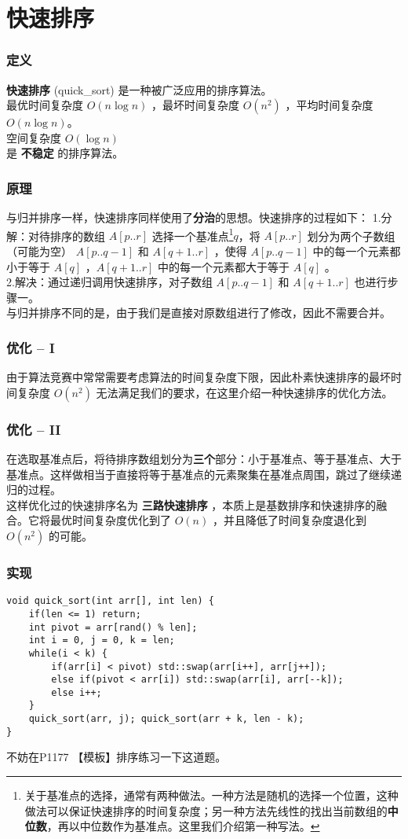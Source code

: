 \documentclass{beamer}
\newcommand{\fdf}[1]{\alert{\textbf{#1}}}
\begin{document}
\section{快速排序}
\begin{frame}
\frametitle{定义}
\fdf{快速排序} (quick\_sort) 是一种被广泛应用的排序算法。\\ 
最优时间复杂度 $O(n\log n)$ ，最坏时间复杂度 $O(n^2)$ ，平均时间复杂度 $O(n\log n)$。\\ 
空间复杂度 $O(\log n)$\\ 
是 \fdf{不稳定} 的排序算法。
\end{frame}
\begin{frame}
\frametitle{原理}
与归并排序一样，快速排序同样使用了\fdf{分治}的思想。快速排序的过程如下：
1.分解：对待排序的数组 $A[p..r]$ 选择一个基准点\footnote{关于基准点的选择，通常有两种做法。一种方法是随机的选择一个位置，这种做法可以保证快速排序的时间复杂度；另一种方法先线性的找出当前数组的\fdf{中位数}，再以中位数作为基准点。这里我们介绍第一种写法。}$q$，将 $A[p..r]$ 划分为两个子数组（可能为空） $A[p..q-1]$ 和 $A[q+1..r]$ ，使得 $A[p..q-1]$ 中的每一个元素都小于等于 $A[q]$ ，$A[q+1..r]$ 中的每一个元素都大于等于 $A[q]$ 。	\\
2.解决：通过递归调用快速排序，对子数组 $A[p..q-1]$ 和 $A[q+1..r]$ 也进行步骤一。\\ 
与归并排序不同的是，由于我们是直接对原数组进行了修改，因此不需要合并。
\end{frame}
\begin{frame}
\frametitle{优化 -- I}
由于算法竞赛中常常需要考虑算法的时间复杂度下限，因此朴素快速排序的最坏时间复杂度 $O(n^2)$ 无法满足我们的要求，在这里介绍一种快速排序的优化方法。
\end{frame}
\begin{frame}
\frametitle{优化 -- II}
在选取基准点后，将待排序数组划分为\fdf{三个}部分：小于基准点、等于基准点、大于基准点。这样做相当于直接将等于基准点的元素聚集在基准点周围，跳过了继续递归的过程。\\
这样优化过的快速排序名为	 \fdf{三路快速排序} ，本质上是基数排序和快速排序的融合。它将最优时间复杂度优化到了 $O(n)$ ，并且降低了时间复杂度退化到 $O(n^2)$ 的可能。
\end{frame}
\begin{frame}[fragile]
\frametitle{实现}
\begin{onlyenv}
\begin{verbatim}
void quick_sort(int arr[], int len) {
    if(len <= 1) return;
    int pivot = arr[rand() % len];
    int i = 0, j = 0, k = len;
    while(i < k) {
        if(arr[i] < pivot) std::swap(arr[i++], arr[j++]);
        else if(pivot < arr[i]) std::swap(arr[i], arr[--k]);
        else i++;
    }
    quick_sort(arr, j); quick_sort(arr + k, len - k);
}
\end{verbatim}
\end{onlyenv}
不妨在P1177	【模板】排序练习一下这道题。
\end{frame}
\end{document}
